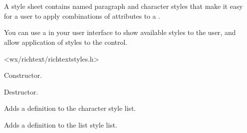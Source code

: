 \section{}\label{wxrichtextstylesheet}

A style sheet contains named paragraph and character styles that make it
easy for a user to apply combinations of attributes to a .

You can use a  in your
user interface to show available styles to the user, and allow application
of styles to the control.




<wx/richtext/richtextstyles.h>





\label{wxrichtextstylesheetwxrichtextstylesheet}


Constructor.

\label{wxrichtextstylesheetdtor}


Destructor.

\label{wxrichtextstylesheetaddcharacterstyle}


Adds a definition to the character style list.

\label{wxrichtextstylesheetaddliststyle}


Adds a definition to the list style list.

\label{wxrichtextstylesheetaddparagraphstyle}


